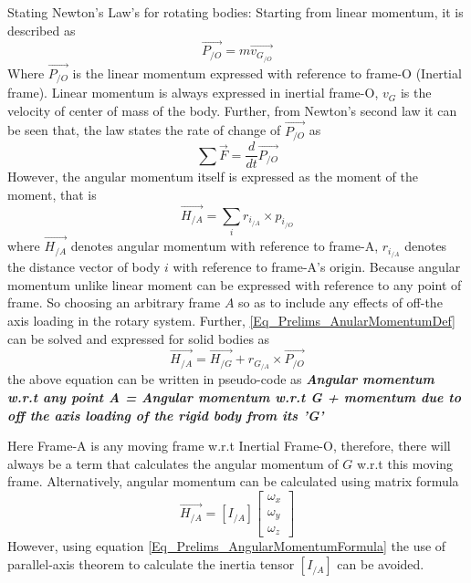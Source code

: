 Stating Newton's Law's for rotating bodies:
Starting from linear momentum, it is described as 
\begin{equation}
\vec{P_{/O}} = m \vec{v_{G_{/O}}}
\end{equation}
Where $\vec{P_{/O}}$ is the linear momentum expressed with reference to frame-O (Inertial frame). Linear momentum is always expressed in inertial frame-O, $v_{G}$ is the velocity of center of mass of the body. Further, from Newton's second law it can be seen that, the law states the rate of change of $\vec{P_{/O}}$ as
\begin{equation}
\sum \vec{F} = \frac{d}{dt}\vec{P_{/O}}
\end{equation}
However, the angular momentum itself is expressed as the moment of the moment, that is
\begin{equation}\label{Eq_Prelims_AnularMomentumDef}
\vec{H_{/A}} = \sum_{i}^{} r_{i_{/A}} \times p_{i_{/O}}
\end{equation}
where $\vec{H_{/A}}$ denotes angular momentum with reference to frame-A, $r_{i_{/A}}$ denotes the distance vector of body $i$ with reference to frame-A's origin. Because angular momentum unlike linear moment can be expressed with reference to any point of frame. So choosing an arbitrary frame $A$ so as to include any effects of off-the axis loading in the rotary system. Further, \eqref{Eq_Prelims_AnularMomentumDef} can be solved and expressed for solid bodies as
\begin{equation} \label{Eq_Prelims_AngularMomentumFormula}
	\vec{H_{/A}} = \vec{H_{/G}} + r_{G_{/A}} \times \vec{P_{/O}}
\end{equation}
the above equation can be written in pseudo-code as
\textbf{\textit{Angular momentum w.r.t any point A = Angular momentum w.r.t G + momentum due to off the axis loading of the rigid body from its 'G'}}

Here Frame-A is any moving frame w.r.t Inertial Frame-O, therefore, there will always be a term that calculates the angular momentum of $G$ w.r.t this moving frame. Alternatively, angular momentum can be calculated using matrix formula
\begin{equation} \label{Eq_Prelims_AngularMometumMatrixForm}
	\vec{H_{/A}} = [I_{/A}] \begin{bmatrix}
	\omega_{x} \\ \omega_{y} \\ \omega_{z}
	\end{bmatrix}
\end{equation}
However, using equation \eqref{Eq_Prelims_AngularMomentumFormula} the use of parallel-axis theorem to calculate the inertia tensor $[I_{/A}]$ can be avoided.

